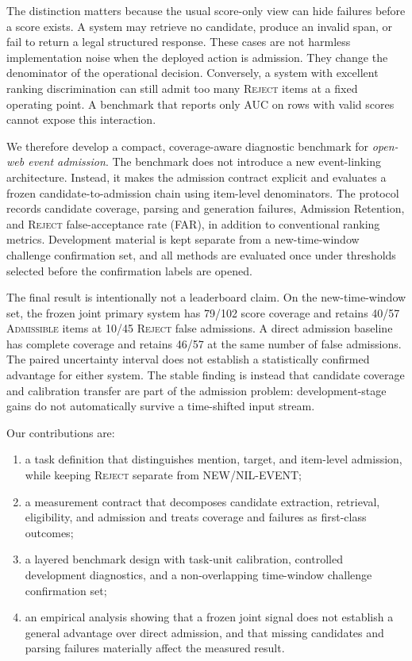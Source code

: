\documentclass[5p,times]{elsarticle}
\newcommand{\admissible}{\mbox{\textsc{Admissible}}}
\newcommand{\reject}{\mbox{\textsc{Reject}}}
\begin{document}
The distinction matters because the usual score-only view can hide failures before a score exists. A system may retrieve no candidate, produce an invalid span, or fail to return a legal structured response. These cases are not harmless implementation noise when the deployed action is admission. They change the denominator of the operational decision. Conversely, a system with excellent ranking discrimination can still admit too many \reject{} items at a fixed operating point. A benchmark that reports only AUC on rows with valid scores cannot expose this interaction.

We therefore develop a compact, coverage-aware diagnostic benchmark for \emph{open-web event admission}. The benchmark does not introduce a new event-linking architecture. Instead, it makes the admission contract explicit and evaluates a frozen candidate-to-admission chain using item-level denominators. The protocol records candidate coverage, parsing and generation failures, Admission Retention, and \reject{} false-acceptance rate (FAR), in addition to conventional ranking metrics. Development material is kept separate from a new-time-window challenge confirmation set, and all methods are evaluated once under thresholds selected before the confirmation labels are opened.

The final result is intentionally not a leaderboard claim. On the new-time-window set, the frozen joint primary system has 79/102 score coverage and retains 40/57 \admissible{} items at 10/45 \reject{} false admissions. A direct admission baseline has complete coverage and retains 46/57 at the same number of false admissions. The paired uncertainty interval does not establish a statistically confirmed advantage for either system. The stable finding is instead that candidate coverage and calibration transfer are part of the admission problem: development-stage gains do not automatically survive a time-shifted input stream.

Our contributions are:
\begin{enumerate}[leftmargin=*,itemsep=2pt]
  \item a task definition that distinguishes mention, target, and item-level admission, while keeping \reject{} separate from NEW/NIL-EVENT;
  \item a measurement contract that decomposes candidate extraction, retrieval, eligibility, and admission and treats coverage and failures as first-class outcomes;
  \item a layered benchmark design with task-unit calibration, controlled development diagnostics, and a non-overlapping time-window challenge confirmation set;
  \item an empirical analysis showing that a frozen joint signal does not establish a general advantage over direct admission, and that missing candidates and parsing failures materially affect the measured result.
\end{enumerate}
\end{document}
